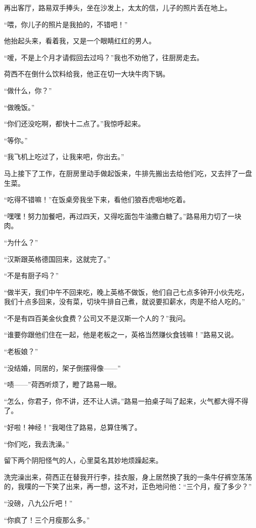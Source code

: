 \par 再出客厅，路易双手捧头，坐在沙发上，太太的信，儿子的照片丢在地上。
\par “喂，你儿子的照片是我拍的，不错吧！”
\par 他抬起头来，看着我，又是一个眼睛红红的男人。
\par “嗳，不是上个月才请假回去过吗？”我也不劝他了，往厨房走去。
\par 荷西不在倒什么饮料给我，他正在切一大块牛肉下锅。
\par “做什么，你？”
\par “做晚饭。”
\par “你们还没吃啊，都快十二点了。”我惊呼起来。
\par “等你。”
\par “我飞机上吃过了，让我来吧，你出去。”
\par 马上接下了工作，在厨房里动手做起饭来，牛排先搬出去给他们吃，又去拌了一盘生菜。
\par “吃得不错嘛！”在饭桌旁我坐下来，看他们狼吞虎咽地吃着。
\par “嘿嘿！努力加餐吧，再过四天，又得吃面包牛油撒白糖了。”路易用力切了一块肉。
\par “为什么？”
\par “汉斯跟英格德国回来，这就完了。”
\par “不是有厨子吗？”
\par “做半天，我们中午不回来吃，晚上英格不做饭，他们自己七点多钟开小伙先吃，我们十点多回来，没有菜，切块牛排自己煮，就说要扣薪水，肉是不给人吃的。”
\par “不是有四百美金伙食费？公司又不是汉斯一个人的？”我问。
\par “谁要你跟他们住在一起，他是老板之一，英格当然赚伙食钱嘛！”路易又说。
\par “老板娘？”
\par “没结婚，同居的，架子倒摆得像——”
\par “啧——”荷西听烦了，瞪了路易一眼。
\par “怎么，你君子，你不讲，还不让人讲。”路易一拍桌子叫了起来，火气都大得不得了。
\par “好啦！神经！”我喝住了路易，总算住嘴了。
\par “你们吃，我去洗澡。”
\par 留下两个阴阳怪气的人，心里莫名其妙地烦躁起来。
\par 洗完澡出来，荷西正在替我开行李，挂衣服，身上居然换了我的一条牛仔裤空荡荡的，我噗的一下笑了出来，再一想，这不对，正色地问他：“三个月，瘦了多少？”
\par “没磅，八九公斤吧！”
\par “你疯了！三个月瘦那么多。”
